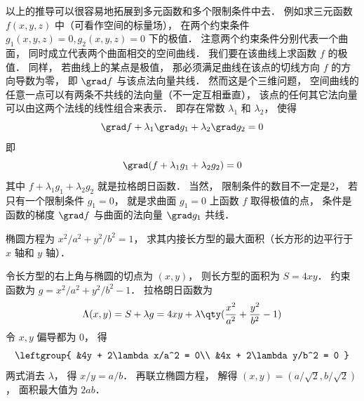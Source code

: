以上的推导可以很容易地拓展到多元函数和多个限制条件中去． 例如求三元函数 $f(x,y,z)$ 中（可看作空间的标量场）， 在两个约束条件 $g_1(x,y,z) = 0, g_2(x,y,z) = 0$ 下的极值． 注意两个约束条件分别代表一个曲面， 同时成立代表两个曲面相交的空间曲线． 我们要在该曲线上求函数 $f$ 的极值． 同样， 若曲线上的某点是极值， 那必须满足曲线在该点的切线方向 $f$ 的方向导数为零， 即 $\grad f$ 与该点法向量共线． 然而这是个三维问题， 空间曲线的任意一点可以有两条不共线的法向量（不一定互相垂直）， 该点的任何其它法向量可以由这两个法线的线性组合来表示． 即存在常数 $\lambda_1$ 和 $\lambda_2$， 使得
\begin{equation}
\grad f + \lambda_1 \grad g_1 + \lambda_2 \grad g_2 = 0
\end{equation}
即
\begin{equation}
\grad (f + \lambda_1 g_1 + \lambda_2 g_2) = 0
\end{equation}
其中 $f + \lambda_1 g_1 + \lambda_2 g_2$ 就是拉格朗日函数． 当然， 限制条件的数目不一定是2， 若只有一个限制条件 $g_1 = 0$， 就是求曲面 $g_1 = 0$ 上函数 $f$ 取得极值的点， 条件是函数的梯度 $\grad f$ 与曲面的法向量 $\grad g_1$ 共线．

\begin{exam}{}
椭圆方程为 $x^2/a^2 + y^2/b^2 = 1$， 求其内接长方型的最大面积（长方形的边平行于 $x$ 轴和 $y$ 轴）．

令长方型的右上角与椭圆的切点为 $(x,y)$， 则长方型的面积为 $S = 4xy$． 约束函数为 $g = x^2/a^2 + y^2/b^2 - 1$． 拉格朗日函数为
\begin{equation}
\Lambda(x,y) = S + \lambda g = 4xy + \lambda \qty(\frac{x^2}{a^2} + \frac{y^2}{b^2} - 1)
\end{equation}
令 $x, y$ 偏导都为 0， 得
\begin{equation}\leftgroup{
&4y + 2\lambda x/a^2 = 0\\
&4x + 2\lambda y/b^2 = 0
}\end{equation}
两式消去 $\lambda$， 得 $x/y = a/b$． 再联立椭圆方程， 解得 $(x,y) = (a/\sqrt{2}, b/\sqrt{2})$， 面积最大值为 $2ab$．
\end{exam}